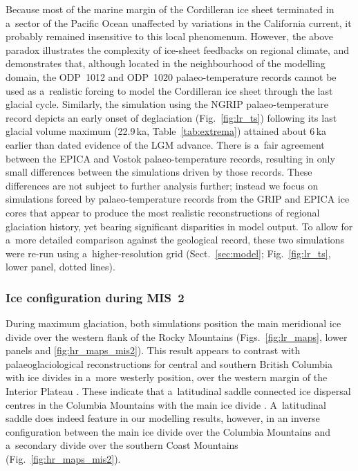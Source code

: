 \documentclass[tc, manuscript]{copernicus}
\begin{document}
      Because most of the marine margin of the Cordilleran ice sheet
      terminated in a~sector of the Pacific Ocean unaffected by variations
      in the California current, it probably remained insensitive to this
      local phenomenum. However, the above paradox illustrates the
      complexity of ice-sheet feedbacks on regional climate, and
      demonstrates that, although located in the neighbourhood of the
      modelling domain, the ODP~1012 and ODP~1020 palaeo-temperature records
      cannot be used as a~realistic forcing to model the Cordilleran ice
      sheet through the last glacial cycle. Similarly, the simulation using
      the NGRIP palaeo-temperature record depicts an early onset of
      deglaciation (Fig.~\ref{fig:lr_ts}) following its last glacial volume
      maximum (22.9\,\unit{ka}, Table~\ref{tab:extrema}) attained about
      6\,\unit{ka} earlier than dated evidence of the LGM advance. There is
      a~fair agreement between the EPICA and Vostok palaeo-temperature
      records, resulting in only small differences between the simulations
      driven by those records. These differences are not subject to further
      analysis further; instead we focus on simulations forced by
      palaeo-temperature records from the GRIP and EPICA ice cores that
      appear to produce the most realistic reconstructions of regional
      glaciation history, yet bearing significant disparities in model
      output. To allow for a~more detailed comparison against the geological
      record, these two simulations were re-run using a~higher-resolution
      grid (Sect.~\ref{sec:model}; Fig.~\ref{fig:lr_ts}, lower panel, dotted
      lines).


\subsubsection{Ice configuration during MIS~2}
\label{sec:mis2}

      During maximum glaciation, both simulations position the main
      meridional ice divide over the western flank of the Rocky Mountains
      (Figs.~\ref{fig:lr_maps}, lower panels and \ref{fig:hr_maps_mis2}).
      This result appears to contrast with palaeoglaciological
      reconstructions for central and southern British Columbia with ice
      divides in a~more westerly position, over the western margin of the
      Interior Plateau \citep{Ryder.etal.1991, Stumpf.etal.2000,
      Kleman.etal.2010, Clague.Ward.2011, Margold.etal.2013a}. These
      indicate that a~latitudinal saddle connected ice dispersal centres in
      the Columbia Mountains with the main ice divide
      \citep{Ryder.etal.1991, Kleman.etal.2010, Clague.Ward.2011,
      Margold.etal.2013a}. A~latitudinal saddle does indeed feature in our
      modelling results, however, in an inverse configuration between the
      main ice divide over the Columbia Mountains and a~secondary divide
      over the southern Coast Mountains (Fig.~\ref{fig:hr_maps_mis2}).
\end{document}
